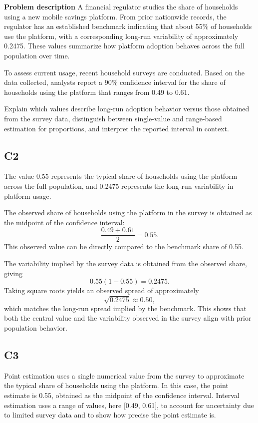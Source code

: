 \begin{ExamProblems}
		\newpage
		\item
		\textbf{Problem description}
		A financial regulator studies the share of households using a new mobile savings platform. From prior nationwide records, the regulator has an established benchmark indicating that about 55\% of households use the platform, with a corresponding long-run variability of approximately 0.2475. These values summarize how platform adoption behaves across the full population over time.
		
		To assess current usage, recent household surveys are conducted. Based on the data collected, analysts report a 90\% confidence interval for the share of households using the platform that ranges from 0.49 to 0.61.
		
		Explain which values describe long-run adoption behavior versus those obtained from the survey data, distinguish between single-value and range-based estimation for proportions, and interpret the reported interval in context.
		
		\subsection*{C2}
		The value 0.55 represents the typical share of households using the platform across the full population, and 0.2475 represents the long-run variability in platform usage.
		
		The observed share of households using the platform in the survey is obtained as the midpoint of the confidence interval:
		\[
		\frac{0.49 + 0.61}{2} = 0.55.
		\]
		This observed value can be directly compared to the benchmark share of 0.55.
		
		The variability implied by the survey data is obtained from the observed share, giving
		\[
		0.55(1 - 0.55) = 0.2475.
		\]
		Taking square roots yields an observed spread of approximately
		\[
		\sqrt{0.2475} \approx 0.50,
		\]
		which matches the long-run spread implied by the benchmark. This shows that both the central value and the variability observed in the survey align with prior population behavior.
		
		\subsection*{C3}
		Point estimation uses a single numerical value from the survey to approximate the typical share of households using the platform. In this case, the point estimate is 0.55, obtained as the midpoint of the confidence interval. Interval estimation uses a range of values, here [0.49, 0.61], to account for uncertainty due to limited survey data and to show how precise the point estimate is.
		

\end{ExamProblems}
